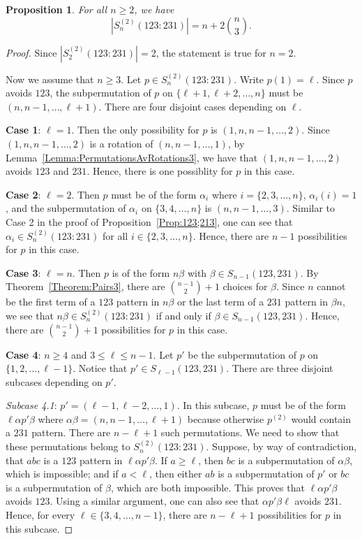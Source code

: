 \documentclass[10pt,a4paper]{amsart}
\newtheorem{proposition}[theorem]{Proposition}
\numberwithin{equation}{section}
\begin{document}
\begin{proposition}\label{Prop:123;231}
    For all $n\geq2$, we have
    \[
    |S_n^{(2)}(123:231)|=n + 2 \binom{n}{3}.
    \]
\end{proposition}
\begin{proof}
Since $|S_2^{(2)}(123:231)|=2$, the statement is true for $n=2$. 

Now we assume that $n\geq3$. Let $p\in S_n^{(2)}(123:231)$. Write $p(1)=\ell$. Since $p$ avoids $123$, the subpermutation of $p$ on $\{\ell+1,\ell+2,\ldots,n\}$ must be $(n,n-1,\ldots,\ell+1)$. There are four 
disjoint cases depending on $\ell$.

    \textbf{Case 1}: $\ell=1$. Then the only possibility for $p$ is $(1,n,n-1,\ldots,2)$. Since $(1,n,n-1,\ldots,2)$ is a rotation of $(n,n-1,\ldots,1)$, by Lemma~\ref{Lemma:PermutationsAvRotations3}, we have that $(1,n,n-1,\ldots,2)$ avoids $123$ and $231$. Hence, there is one possiblity for $p$ in this case.

    {\bf Case 2}: $\ell=2$. Then $p$ must be of the form $\alpha_i$ where $i=\{2,3,\ldots,n\}$, $\alpha_i(i)=1$, and the subpermutation of $\alpha_i$ on $\{3,4,\ldots,n\}$ is $(n,n-1,\ldots,3)$. Similar to Case 2 in the proof of Proposition~\ref{Prop:123;213}, one can see that $\alpha_i\in S_n^{(2)}(123:231)$ for all $i\in\{2,3,\ldots,n\}$. Hence, there are $n-1$ possibilities for $p$ in this case.


    {\bf Case 3}: $\ell=n$. Then $p$ is of the form $n\beta$ with $\beta\in S_{n-1}(123,231)$. By Theorem~\ref{Theorem:Pairs3}, there are $\binom{n-1}{2}+1$ choices for $\beta$. Since $n$ cannot be the first term of a $123$ pattern in $n\beta$ or the last term of a $231$ pattern in $\beta n$, we see that $n\beta\in S_n^{(2)}(123:231)$ if and only if $\beta\in S_{n-1}(123,231)$. Hence, there are $\binom{n-1}{2}+1$ possibilities for $p$ in this case.

    {\bf Case 4}: $n\geq4$ and $3\leq \ell\leq n-1$. Let $p'$ be the subpermutation of $p$ on $\{1,2,\ldots,\ell-1\}$. Notice that $p'\in S_{\ell-1}(123,231)$. There are three disjoint subcases depending on $p'$.

    {\it Subcase 4.1}: $p'=(\ell-1,\ell-2,\ldots,1)$. In this subcase, $p$ must be of the form $\ell\alpha p'\beta$ where $\alpha\beta=(n,n-1,\ldots,\ell+1)$ because otherwise $p^{(2)}$ would contain a $231$ pattern. There are $n-\ell+1$ such permutations. We need to show that these permutations belong to $S_n^{(2)}(123:231)$. 
Suppose, by way of contradiction, that $abc$ is a $123$ pattern in $\ell\alpha p'\beta$. If $a\geq\ell$, then $bc$ is a subpermutation of $\alpha\beta$, which is impossible; and if $a<\ell$, then either $ab$ is a subpermutation of $p'$ or $bc$ is a subpermutation of $\beta$, which are both impossible. This proves that $\ell\alpha p'\beta$ avoids $123$. Using a similar argument, one can also see that $\alpha p'\beta\ell$ avoids $231$. Hence, for every $\ell\in\{3,4,\ldots,n-1\}$, there are $n-\ell+1$ possibilities for $p$ in this subcase.
    

\end{proof}
\end{document}
